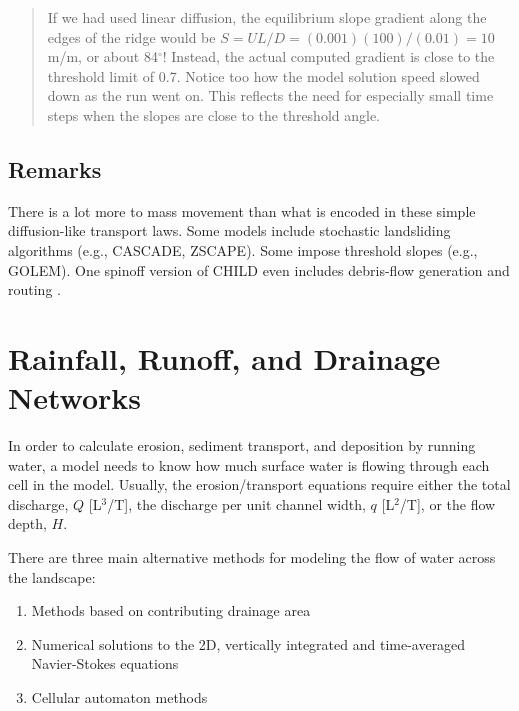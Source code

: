 \documentclass[12pt,reqno]{amsart}
\begin{document}
\begin{quote}
\small
{\sf
{}
If we had used linear diffusion, the equilibrium slope gradient along the edges of the ridge would be $S = UL/D = (0.001)(100)/(0.01) = 10$m/m, or about 84$^\circ$! Instead, the actual computed gradient is close to the threshold limit of 0.7. Notice too how the model solution speed slowed down as the run went on. This reflects the need for especially small time steps when the slopes are close to the threshold angle.
}
\end{quote}

\subsection{Remarks}

There is a lot more to mass movement than what is encoded in these simple diffusion-like transport laws. Some models include stochastic landsliding algorithms (e.g., CASCADE, ZSCAPE). Some impose threshold slopes (e.g., GOLEM). One spinoff version of CHILD even includes debris-flow generation and routing \citep{lancaster2003effects}.

\section{Rainfall, Runoff, and Drainage Networks}

In order to calculate erosion, sediment transport, and deposition by running water, a model needs to know how much surface water is flowing through each cell in the model. Usually, the erosion/transport equations require either the total discharge, $Q$ [L$^3$/T], the discharge per unit channel width, $q$ [L$^2$/T], or the flow depth, $H$.

There are three main alternative methods for modeling the flow of water across the landscape:
\begin{enumerate}
\item Methods based on contributing drainage area
\item Numerical solutions to the 2D, vertically integrated and time-averaged Navier-Stokes equations
\item Cellular automaton methods
\end{enumerate}
\end{document}
